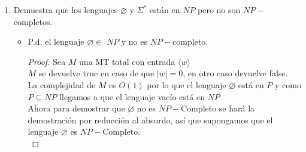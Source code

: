 \documentclass[letterpaper,10pt]{article}
\begin{document}
\begin{enumerate}
\begin{proof}
\begin{itemize}
             \item Si $C_i=z$ está compuesta por una sola variable, entonces
             agregamos dos nuevas variables $x$ y $y$ y se cambia $C_i$ por
             $(z\vee x \vee y ), (z\vee x \vee \neg y ),(z\vee \neg x \vee y
             ),(z\vee \neg x \vee \neg y )$
     			
             \item Si $C_i=z\vee w$, entonces se añade una $x$ y se cambia
             $C_i$ por $(z\vee w \vee x),(z\vee w \vee \neg x)$   
     			
             \item Si $C_i=z_1 \vee z_2 \vee ... \vee z_k$ con $k>3$ variables,
             entonces se añade $k-3$  nuevas variables  $x_1,x_2,...,k_{k-3}$ y
             se cambia $C_i$ por $$(z_1\vee z_2 \vee x_1),$$
             
             $$(\neg x_1\vee z_3 \vee  x_2)$$
             $$(\neg x_2\vee z_4 \vee  x_3)$$
             $$.$$
             $$.$$
             $$.$$
             $$\neg x_{k-4}\vee z_{k-2} \vee x_{k-3}$$
             $$\neg x_{k-3}\vee z_{k-1} \vee x_{k-k}$$
      		
         \end{itemize}
     		
     	\end{proof}
     
     \newpage   
     \item Demuestra que los lenguajes $\varnothing$ y $\Sigma^{*}$
     están en $NP$ pero no son $NP-$completos.
		
     \begin{itemize}
        \item P.d. el lenguaje $\varnothing \in $ $NP$ y no es $NP-$completo.

        \begin{proof}
            Sea $M$ una MT total con entrada $\langle w \rangle$\\
				
            $M$ se devuelve true en caso de que $|w|=0$, en otro caso devuelve
            false.\\
				
            La complejidad de $M$ es $O(1)$ por lo que el lenguaje $\varnothing$
            está en $P$ y como $P \subseteq NP$ llegamos a que el lenguaje 
            vacío está en $NP$\\
				
            Ahora para demostrar que $\varnothing$ no es $NP-$Completo se hará
            la demostración por reducción al absurdo, así que supongamos que el
            lenguaje $\varnothing$ es $NP-$Completo.\\
				

\end{proof}
\end{itemize}
\end{enumerate}
\end{document}
